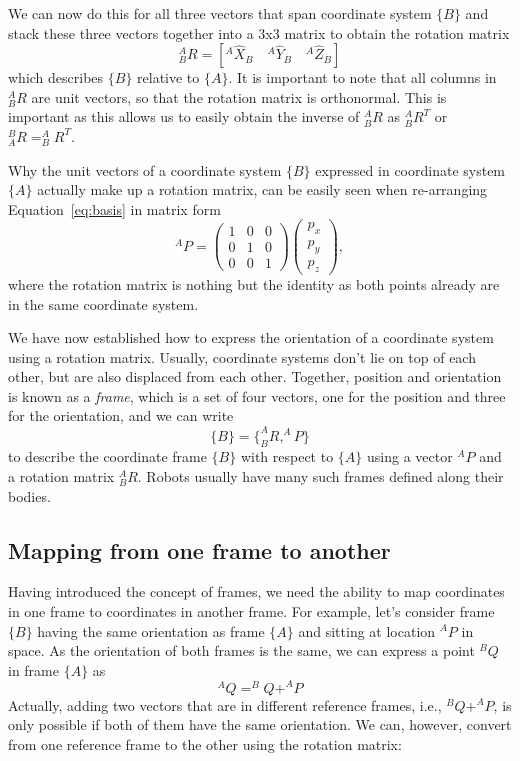 We can now do this for all three vectors that span coordinate system $\{B\}$ and stack these three vectors together into a 3x3 matrix to obtain the rotation matrix
%
\begin{equation}
^A_BR=[^A\hat{X}_B \quad ^A\hat{Y}_B \quad ^A\hat{Z}_B]
\end{equation}
%
which describes $\{B\}$ relative to $\{A\}$. It is important to note that all columns in $ ^A_BR$ are unit vectors, so that the rotation matrix is orthonormal. This is important as this allows us to easily obtain the inverse of $ ^A_BR$ as $ ^A_BR^T$ or
$ ^B_AR=^A_BR^T$.

Why the unit vectors of a coordinate system $\{B\}$ expressed in coordinate system $\{A\}$ actually make up a rotation matrix, can be easily seen when re-arranging Equation~\ref{eq:basis} in matrix form
\begin{equation}
^AP=\left(\begin{array}{ccc}1 & 0 & 0\\0 & 1 & 0\\0 & 0 & 1\end{array}\right)\left(\begin{array}{c}p_x\\p_y\\p_z\end{array}\right),
\end{equation}
where the rotation matrix is nothing but the identity as both points already are in the same coordinate system.

We have now established how to express the orientation of a coordinate system using a rotation matrix. Usually, coordinate systems don't lie on top of each other, but are also displaced from each other.
Together, position and orientation is known as a \emph{frame}, which is a set of four vectors, one for the position and three for the orientation, and we can write
%
\begin{equation}
\{B\}=\{^A_BR, ^AP\}
\end{equation}
%
to describe the coordinate frame $\{B\}$ with respect to $\{A\}$ using a vector $^AP$ and a rotation matrix $^A_BR$. Robots usually have many such frames defined along their bodies.

\subsection{Mapping from one frame to another}
Having introduced the concept of frames, we need the ability to map coordinates in one frame to coordinates in another frame. For example, let's consider frame $\{B\}$ having the same orientation as frame $\{A\}$ and sitting at location $^AP$ in space. As the orientation of both frames is the same, we can express a point $ ^BQ$ in frame $\{A\}$ as
%
\begin{equation}
^AQ=^BQ+^AP
\end{equation}
%
Actually, adding two vectors that are in different reference frames, i.e., $ ^BQ+^AP$, is only possible if both of them have the same orientation. We can, however, convert from one reference frame to the other using the rotation matrix:

